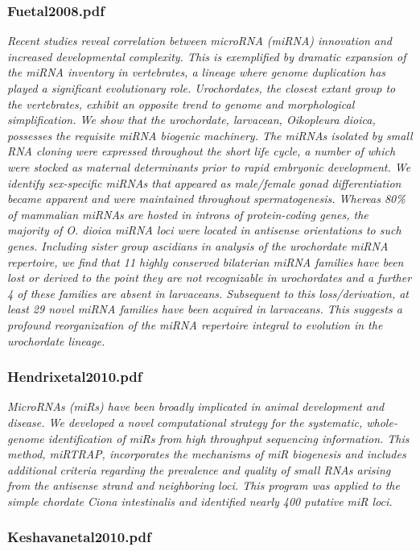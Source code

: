 \documentclass[graybox]{svmult}
\begin{document}
\subsubsection{Fuetal2008.pdf}
\cite{Fu2008}
\textit{Recent studies reveal correlation between microRNA (miRNA) innovation and increased developmental complexity. This is exemplified by dramatic expansion of the miRNA inventory in vertebrates, a lineage where genome duplication has played a significant evolutionary role. Urochordates, the closest extant group to the vertebrates, exhibit an opposite trend to genome and morphological simplification. We show that the urochordate, larvacean, Oikopleura dioica, possesses the requisite miRNA biogenic machinery. The miRNAs isolated by small RNA cloning were expressed throughout the short life cycle, a number of which were stocked as maternal determinants prior to rapid embryonic development. We identify sex-specific miRNAs that appeared as male/female gonad differentiation became apparent and were maintained throughout spermatogenesis. Whereas 80{\%} of mammalian miRNAs are hosted in introns of protein-coding genes, the majority of O. dioica miRNA loci were located in antisense orientations to such genes. Including sister group ascidians in analysis of the urochordate miRNA repertoire, we find that 11 highly conserved bilaterian miRNA families have been lost or derived to the point they are not recognizable in urochordates and a further 4 of these families are absent in larvaceans. Subsequent to this loss/derivation, at least 29 novel miRNA families have been acquired in larvaceans. This suggests a profound reorganization of the miRNA repertoire integral to evolution in the urochordate lineage.}
\subsubsection{Hendrixetal2010.pdf}
\cite{Hendrix2010}
\textit{MicroRNAs (miRs) have been broadly implicated in animal development and disease. We developed a novel computational strategy for the systematic, whole-genome identification of miRs from high throughput sequencing information. This method, miRTRAP, incorporates the mechanisms of miR biogenesis and includes additional criteria regarding the prevalence and quality of small RNAs arising from the antisense strand and neighboring loci. This program was applied to the simple chordate Ciona intestinalis and identified nearly 400 putative miR loci.}

\subsubsection{Keshavanetal2010.pdf}
\end{document}
